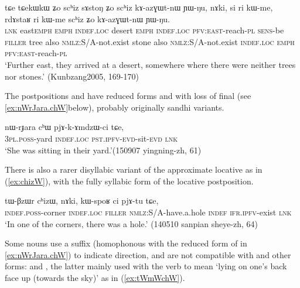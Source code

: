 \begin{exe}
\ex \label{ex:schiz.kazGWtnW}
 \gll  tɕe tɕekɯ\redp{}kɯ ʑo scʰiz sɤstoŋ ʑo scʰiz kɤ-azɣɯt-nɯ ɲɯ-ŋu, nɤki, si ri kɯ-me, rdɤstaʁ ri kɯ-me scʰiz ʑo kɤ-azɣɯt-nɯ ɲɯ-ŋu. \\
 \textsc{lnk} east\redp{}\textsc{emph} \textsc{emph} \textsc{indef}.\textsc{loc} desert \textsc{emph} \textsc{indef}.\textsc{loc} \textsc{pfv}:\textsc{east}-reach-\textsc{pl} \textsc{sens}-be \textsc{filler} tree also \textsc{nmlz}:S/A-not.exist stone also \textsc{nmlz}:S/A-not.exist \textsc{indef}.\textsc{loc}  \textsc{emph}  \textsc{pfv}:\textsc{east}-reach-\textsc{pl} \\
 \glt `Further east, they arrived at  a desert, somewhere where there were neither trees nor stones.' (Kunbzang2005, 169-170)
\end{exe}

The postpositions  and  have reduced forms  and  with loss of final  (see \ref{ex:nWrJara.chW}below), probably originally sandhi variants.

\begin{exe}
\ex \label{ex:nWrJara.chW}
\gll nɯ-rɟara cʰɯ pjɤ-k-ɤmdzɯ-ci tɕe, \\
\textsc{3pl}.\textsc{poss}-yard \textsc{indef}.\textsc{loc} \textsc{pst}.\textsc{ipfv}-\textsc{evd}-sit-\textsc{evd} \textsc{lnk} \\
\glt `She was sitting in their yard.'(150907 yingning-zh, 61)
\end{exe}

There is also a rarer disyllabic variant of the approximate locative  as in (\ref{ex:chizW}), with the fully syllabic form  of the locative postposition.

\begin{exe}
\ex \label{ex:chizW}
\gll tɯ-βzɯr cʰizɯ, nɤki, kɯ-spoʁ ci pjɤ-tu tɕe,  \\
\textsc{indef}.\textsc{poss}-corner \textsc{indef}.\textsc{loc} \textsc{filler} \textsc{nmlz}:S/A-have.a.hole \textsc{indef} \textsc{ifr}.\textsc{ipfv}-exist \textsc{lnk} \\
\glt `In one of the corners, there was a hole.' (140510 sanpian sheye-zh, 64)
\end{exe}

Some nouns use a suffix  (homophonous with the reduced form of  in \ref{ex:nWrJara.chW}) to indicate direction, and are not compatible with  and other forms:  and , the latter mainly used with the verb  to mean `lying on one's back face up (towards the sky)' as in (\ref{ex:tWmWchW}).

